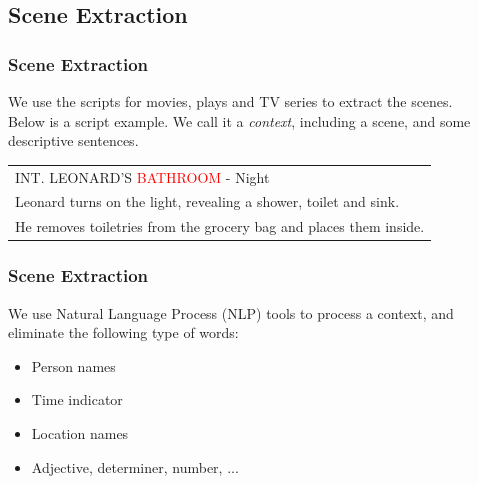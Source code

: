 \documentclass[xcolor=table,slidestop,compress,mathserif]{beamer}
\begin{document}
\subsection{Scene Extraction}
\begin{frame}
	\frametitle{Scene Extraction}	
	We use the scripts for movies, plays and TV series to extract the scenes. \\ 
	Below is a script example. 
	We call it a \textit{context}, including a scene, and some descriptive sentences. 
	\begin{table}[h]
		\begin{tabular}{|l|}
		\hline
		INT. LEONARD'S \textcolor{red}{BATHROOM} - Night \\ 
		Leonard turns on the light, revealing a shower, toilet and sink.\\
		He removes toiletries from the grocery bag and places them inside. \\ 
		\hline
		\end{tabular}
	\end{table}
\end{frame}
\begin{frame}
	\frametitle{Scene Extraction}
	We use Natural Language Process (NLP) tools to process a context, and eliminate the following type of words: \\ 
	\begin{itemize}
		\item{Person names} 
		\item{Time indicator}
		\item{Location names}
		\item{Adjective, determiner, number, ...}
	\end{itemize}

	\begin{table}[htb]
	\centering
	\caption{Top 10 Occurred Scenes}
	\end{table}
\end{frame}
\end{document}
